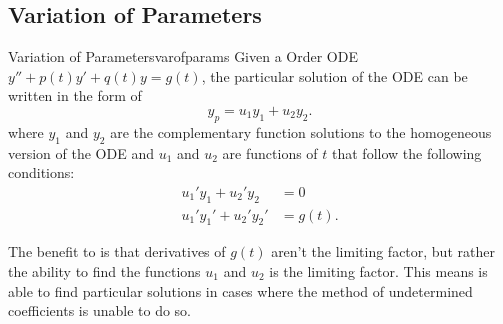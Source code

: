 \documentclass[../notes.tex]{subfiles}
\begin{document}
\subsection{Variation of Parameters}

\begin{theorem}{Variation of Parameters}{varofparams}
				Given a  Order ODE $y'' + p(t) y' + q(t) y = g(t)$, the particular solution of the ODE can be written in the form of
				\[
				y_p = u_1 y_1 + u_2 y_2
				.\] 
				where $y_1$ and $y_2$ are the complementary function solutions to the homogeneous version of the ODE and $u_1$ and $u_2$ are functions of $t$ that follow the following conditions:
				\begin{align*}
								 u_1' y_1 + u_2' y_2 &= 0 \\
								 u_1' y_1' + u_2' y_2' &= g(t)
				.\end{align*}
\end{theorem}

The benefit to  is that derivatives of $g(t)$ aren't the limiting factor, but rather the ability to find the functions $u_1$ and $u_2$ is the limiting factor. This means  is able to find particular solutions in cases where the method of undetermined coefficients is unable to do so.

\centering
{}
\end{document}
